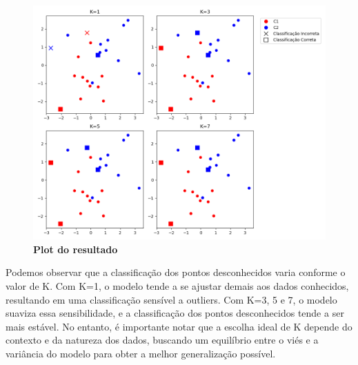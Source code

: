 \begin{enumerate}[label=E\arabic*]
\begin{figure}[H]
    \caption{\textbf{Plot do resultado}}
       \centering
       \includegraphics[width=\textwidth]{ex5.png}
\end{figure}


Podemos observar que a classificação dos pontos desconhecidos varia conforme o valor de K. Com K=1, o modelo tende a se ajustar demais aos dados conhecidos, resultando em uma classificação sensível a outliers. Com K=3, 5 e 7, o modelo suaviza essa sensibilidade, e a classificação dos pontos desconhecidos tende a ser mais estável. No entanto, é importante notar que a escolha ideal de K depende do contexto e da natureza dos dados, buscando um equilíbrio entre o viés e a variância do modelo para obter a melhor generalização possível.





\end{enumerate}